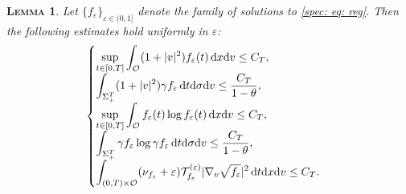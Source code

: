 \documentclass[10pt, reqno]{amsart}
\theoremstyle{plain}
\newtheorem{lemma}[theorem]{\normalfont \scshape Lemma}
\theoremstyle{definition}
\theoremstyle{remark}
\numberwithin{equation}{section}
\newcommand{\calO}{\mathcal O}
\newcommand{\calT}{\mathcal T}
\newcommand{\ve}{\varepsilon}
\newcommand{\dx}{\textnormal{d}x}
\newcommand{\dv}{\textnormal{d}v}
\newcommand{\dt}{\textnormal{d}t}
\newcommand{\tnd}{\textnormal{d}}
\begin{document}
\begin{lemma} \label{spec: lem: unif}
    Let $\{f_\ve\}_{\ve\in (0,1]}$ denote the family of solutions to \eqref{spec: eq: reg}. Then the following estimates hold uniformly in $\ve$:
    \begin{align*}
        \begin{cases}
        \displaystyle \sup_{t\in [0,T]} \int_{\calO} (1+|v|^2) f_\ve(t) \,\dx\dv  \le C_T,\\
        \displaystyle \int_{\Sigma_+^T} (1+|v|^2) \gamma f_\ve \,\dt\tnd\sigma\dv \le \frac{C_T}{1-\theta}, \\
        \displaystyle \sup_{t\in [0,T]} \int_{\calO} f_\ve(t) \log f_\ve(t) \,\dx\dv \le C_T, \\
        \displaystyle \int_{\Sigma_+^T} \gamma f_\ve \log \gamma f_\ve \,\dt\tnd\sigma\dv \le \frac{C_T}{1-\theta}, \\
        \displaystyle \int_{(0,T)\times \calO} (\nu_{f_\ve} + \ve) \calT_{f_\ve}^{(\ve)} |\nabla_v \sqrt{f_\ve}|^2 \,\dt\dx\dv \le C_T. 
        \end{cases}
    \end{align*}
\end{lemma}
\end{document}
